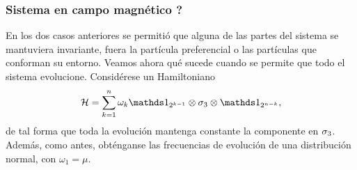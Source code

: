 \subsubsection{Sistema en campo magnético ?}


En los dos casos anteriores se permitió que alguna de las partes del sistema se mantuviera invariante, fuera la partícula preferencial  o las partículas que conforman su entorno. Veamos ahora qué sucede cuando se permite que todo el sistema evolucione. Considérese un Hamiltoniano
\begin{equation*}
    \mcH=\sum_{k=1}^{n}\omega_{k}\Id_{2^{k-1}}\otimes \pauli{3} \otimes \Id_{2^{n-k}},
\end{equation*}
de tal forma que toda la evolución mantenga constante la componente en $\sigma_{3}$. Además, como antes, obténganse las frecuencias de evolución de una distribución normal, con $\omega_{1}=\mu$.

